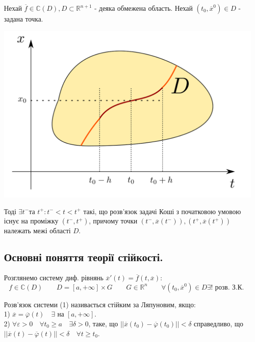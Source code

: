 \documentclass[14pt,a4paper]{scrartcl}
\theoremstyle{definition}
\theoremstyle{remark}
\theoremstyle{definition}
\theoremstyle{definition}
\begin{document}
\begin{boxteo}
    Нехай $\overline{f} \in \mathbb{C}(D), D \subset \mathbb{R}^{n+1}$ - деяка обмежена область. Нехай $(t_0, \overline{x}^0) \in D$ - задана точка.

    \begin{center} \includegraphics[scale=0.3]{assets/lectures-d0fd0868.png} \end{center}
    Тоді $\exists t^{-} $та  $t^{+} :  t^{-} < t < t^{+}$ такі, що розв'язок задачі Коші з початковою умовою існує на проміжку $ (t^{-}, t^{+})$, причому точки $ (t^-, \overline{x} (t^-)), (t^+, \overline{x} (t^+))$ належать межі області $D$.
\end{boxteo}
\subsection{Основні поняття теорії стійкості.}
Розглянемо систему диф. рівнянь $\overline{x}'(t) = \overline{f} (t, \overline{x})$:
$$f \in   \mathbb{C}(D)\qquad D = [a, +\infty ]  \times G\qquad G \in \mathbb{R}^{n} \qquad  \forall (t_0, \overline{x}^0) \in D  \exists! \text{ розв. З.К. } $$

\bd Розв'язок системи (1) називається стійким за Ляпуновим, якщо:\\
1) $\overline{x} = \overline{\varphi } (t)  \quad \exists$ на $[a, +\infty]$.\\
2) $\forall \varepsilon > 0 \quad \forall t_0 \geq a \quad \exists \delta > 0$, таке, що $ \left|\left| \overline{x}(t_0) - \overline{\varphi}(t_0) \right|\right| < \delta $ справедливо, що $ \left| \left|
\overline{x} (t) - \overline{\varphi} (t)
  \right|  \right|  < \delta  \quad \forall t \geq t_0$.
\ed
\end{document}
